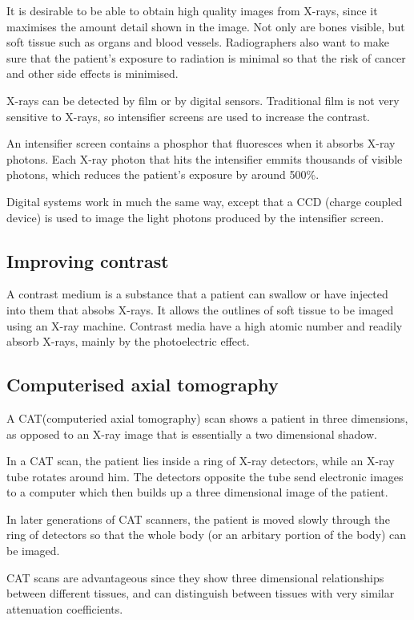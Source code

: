 \documentclass{article}
\begin{document}
It is desirable to be able to obtain high quality images from X-rays, since it
maximises the amount detail shown in the image. Not only are bones visible, but
soft tissue such as organs and blood vessels. Radiographers also want to make
sure that the patient's exposure to radiation is minimal so that the risk of
cancer and other side effects is minimised.

X-rays can be detected by film or by digital sensors. Traditional film is not
very sensitive to X-rays, so intensifier screens are used to increase the
contrast.

An intensifier screen contains a phosphor that fluoresces when it absorbs X-ray
photons. Each X-ray photon that hits the intensifier emmits thousands of visible
photons, which reduces the patient's exposure by around 500\%.

Digital systems work in much the same way, except that a CCD (charge coupled
device) is used to image the light photons produced by the intensifier screen.

\subsection{Improving contrast}

A contrast medium is a substance that a patient can swallow or have injected
into them that absobs X-rays. It allows the outlines of soft tissue to be imaged
using an X-ray machine. Contrast media have a high atomic number and readily
absorb X-rays, mainly by the photoelectric effect.

\subsection{Computerised axial tomography}

A CAT(computeried axial tomography) scan shows a patient in three dimensions, as
opposed to an X-ray image that is essentially a two dimensional shadow.

In a CAT scan, the patient lies inside a ring of X-ray detectors, while an X-ray
tube rotates around him. The detectors opposite the tube send electronic images
to a computer which then builds up a three dimensional image of the patient.

In later generations of CAT scanners, the patient is moved slowly through the
ring of detectors so that the whole body (or an arbitary portion of the body)
can be imaged.

CAT scans are advantageous since they show three dimensional relationships
between different tissues, and can distinguish between tissues with very similar
attenuation coefficients.
\end{document}
